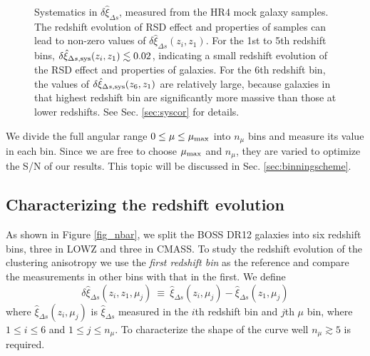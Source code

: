 \documentclass[iop]{emulateapj}
\begin{document}
\begin{figure}
   \caption{\label{fig_sys}
   Systematics in $\delta \hat \xi_{\Delta s}$, measured from the HR4 mock galaxy samples.
   The redshift evolution of RSD effect and properties of samples can lead to non-zero values of $\delta \hat\xi_{\Delta s}(z_i,z_1)$.
   For the 1st to 5th redshift bins, $\delta\hat\xi_{\Delta s, \rm sys}(z_i,z_1)\lesssim0.02$,
    indicating a small redshift evolution of the RSD effect and properties of galaxies.
   For the 6th redshift bin, the values of $\delta\hat\xi_{\Delta s, \rm sys}(z_6,z_1)$ are relatively large,
   because galaxies in that highest redshift bin are significantly more massive than those at lower redshifts.
   See Sec. \ref{sec:syscor} for details.
   }
\end{figure}


We divide the full angular range $0\leq\mu\leq\mu_{\rm max}$ into $n_{\mu}$ bins and measure its value in each bin.
Since we are free to choose $\mu_{\rm max}$ and $n_{\mu}$,
they are varied to optimize the S/N of our results.
This topic will be discussed in Sec. \ref{sec:binningscheme}.

\subsection{Characterizing the redshift evolution}


As shown in Figure \ref{fig_nbar}, we split the BOSS DR12 galaxies into six redshift bins, three in LOWZ and three in CMASS.
To study the redshift evolution of the clustering anisotropy 
we use the {\it first redshift bin} as the reference and compare the measurements in other bins with that in the first.
We define
\begin{equation} \label{eq:deltahatxi}
\delta \hat\xi_{\Delta s}(z_i,z_1,\mu_j)\ \equiv\ \hat\xi_{\Delta s}(z_i,\mu_j) - \hat\xi_{\Delta s}(z_1,\mu_j)
\end{equation}
where $\hat\xi_{\Delta s}(z_i,\mu_j)$ is $\hat\xi_{\Delta s}$ measured in the $i$th redshift bin and $j$th $\mu$ bin,
where $1\leq i \leq 6$ and $1\leq j \leq n_{\mu}$.
To characterize the shape of the curve well $n_\mu \gtrsim5$ is required.
\end{document}
